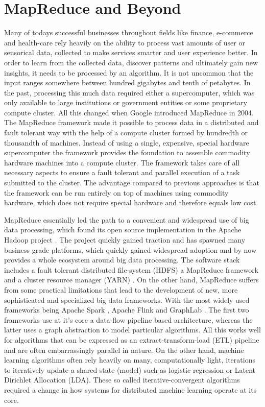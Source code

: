 \section{MapReduce and Beyond}
Many of todays successful businesses throughout fields like finance, e-commerce and health-care rely heavily on the ability to process vast amounts of user or sensorical data, collected to make services smarter and user experience better.
In order to learn from the collected data, discover patterns and ultimately gain new insights, it needs to be processed by an algorithm.
It is not uncommon that the input ranges somewhere between hundred gigabytes and tenth of petabytes.
In the past, processing this much data required either a supercomputer, which was only available to large institutions or government entities or some proprietary compute cluster.
All this changed when Google introduced MapReduce \cite{Dean2004} in 2004.
The MapReduce framework made it possible to process data in a distributed and fault tolerant way with the help of a compute cluster formed by hundredth or thousandth of machines.
Instead of using a single, expensive, special hardware supercomputer the framework provides the foundation to assemble commodity hardware machines into a compute cluster.
The framework takes care of all necessary aspects to ensure a fault tolerant and parallel execution of a task submitted to the cluster.
The advantage compared to previous approaches is that the framework can be run entirely on top of machines using commodity hardware, which does not require special hardware and therefore equals low cost.

MapReduce essentially led the path to a convenient and widespread use of big data processing, which found its open source implementation in the Apache Hadoop project \cite{hadoop2009hadoop}.
The project quickly gained traction and has spawned many business grade platforms, which quickly gained widespread adoption and by now provides a whole ecosystem around big data processing. The software stack includes a fault tolerant distributed file-system (HDFS) a MapReduce framework and a cluster resource manager (YARN) \cite{KumarVavilapalli2013}.
On the other hand, MapReduce suffers from some practical limitations that lead to the development of new, more sophisticated and specialized big data frameworks. With the most widely used frameworks being Apache Spark \cite{Zaharia2010}, Apache Flink \cite{Alexandrov2014} and GraphLab \cite{Low2012}.
The first two frameworks use at it's core a data-flow pipeline based architecture, whereas the latter uses a graph abstraction to model particular algorithms.
All this works well for algorithms that can be expressed as an extract-transform-load (ETL) pipeline and are often embarrassingly parallel in nature.
On the other hand, machine learning algorithms often rely heavily on many, computationally light, iterations to iteratively update a shared state (model) such as logistic regression or Latent Dirichlet Allocation (LDA).
These so called iterative-convergent algorithms required a change in how systems for distributed machine learning operate at its core.


